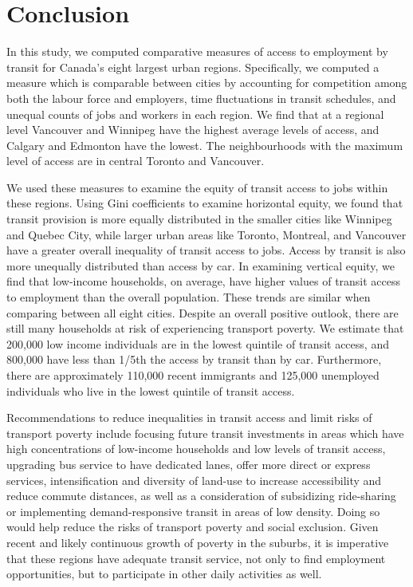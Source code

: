 \documentclass[11 pt, letterpaper]{article}
\begin{document}
{\newpage

\section{Conclusion}

In this study, we computed comparative measures of access to employment by transit for Canada's eight largest urban regions. Specifically, we computed a measure which is comparable between cities by accounting for competition among both the labour force and employers, time fluctuations in transit schedules, and unequal counts of jobs and workers in each region. We find that at a regional level Vancouver and Winnipeg have the highest average levels of access, and Calgary and Edmonton have the lowest. The neighbourhoods with the maximum level of access are in central Toronto and Vancouver.

We used these measures to examine the equity of transit access to jobs within these regions. Using Gini coefficients to examine horizontal equity, we found that transit provision is more equally distributed in the smaller cities like Winnipeg and Quebec City, while larger urban areas like Toronto, Montreal, and Vancouver have a greater overall inequality of transit access to jobs. Access by transit is also more unequally distributed than access by car. In examining vertical equity, we find that low-income households, on average, have higher values of transit access to employment than the overall population. These trends are similar when comparing between all eight cities. Despite an overall positive outlook, there are still many households at risk of experiencing transport poverty. We estimate that 200,000 low income individuals are in the lowest quintile of transit access, and 800,000 have less than 1/5th the access by transit than by car. Furthermore, there are approximately 110,000 recent immigrants and 125,000 unemployed individuals who live in the lowest quintile of transit access. 

Recommendations to reduce inequalities in transit access and limit risks of transport poverty include focusing future transit investments in areas which have high concentrations of low-income households and low levels of transit access, upgrading bus service to have dedicated lanes, offer more direct or express services, intensification and diversity of land-use to increase accessibility and reduce commute distances, as well as a consideration of subsidizing ride-sharing or implementing demand-responsive transit in areas of low density. Doing so would help reduce the risks of transport poverty and social exclusion. Given recent and likely continuous growth of poverty in the suburbs, it is imperative that these regions have adequate transit service, not only to find employment opportunities, but to participate in other daily activities as well.

}
\end{document}
